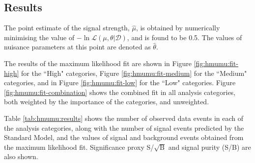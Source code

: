 \subsection{Results}

The point estimate of the signal strength, $\hat\mu$, is obtained
by numerically minimising the value of $-\ln{\mathcal{L}}(\mu, \theta | \mathcal{D})$,
and is found to be 0.5. The values of nuisance parameters at this
point are denoted as $\hat\theta$.

The results of the maximum likelihood fit are shown in Figure
\ref{fig:hmumu:fit-high} for the ``High" categories, Figure
\ref{fig:hmumu:fit-medium} for the ``Medium" categories,
and in Figure \ref{fig:hmumu:fit-low} for the ``Low" categories.
Figure \ref{fig:hmumu:fit-combination} shows the combined fit in
all analysis categories, both weighted by the importance of the
categories, and unweighted.

Table \ref{tab:hmumu:results} shows the number of observed data events
in each of the analysis categories, along with the number of signal events
predicted by the Standard Model, and the values of signal and background
events obtained from the maximum likelihood fit. Significance proxy
S/$\sqrt{\text{B}}$ and signal purity (S/B) are also shown.

